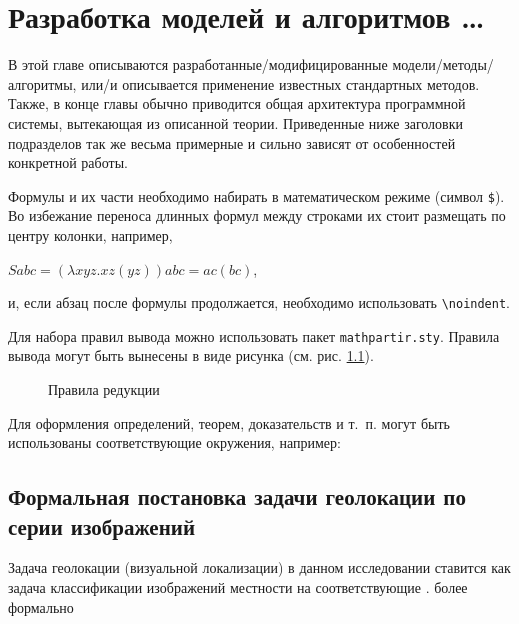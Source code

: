 \chapter{Разработка моделей и алгоритмов \dots}

В этой главе описываются разработанные/модифицированные модели/методы/
алгоритмы, или/и описывается применение известных стандартных методов. Также, 
в конце главы обычно приводится общая архитектура программной системы, 
вытекающая из описанной теории. Приведенные ниже заголовки подразделов так же 
весьма примерные и сильно зависят от особенностей конкретной работы.

Формулы и их части необходимо набирать в математическом режиме
(символ \verb|$|). Во избежание переноса длинных формул между строками их 
стоит размещать по центру колонки, например,
\begin{center}
$S a b c = (\lambda x y z. x z (y z)) a b c = a c (b c)$,
\end{center}
\noindent и, если абзац после формулы продолжается, необходимо использовать 
\verb|\noindent|.

Для набора правил вывода можно использовать пакет \texttt{mathpartir.sty}. 
Правила вывода могут быть вынесены в виде рисунка (см. рис. 
\ref{img:inferrules}).

\begin{figure}[t]
  \centering
  \caption{Правила редукции}
  \label{img:inferrules}
\end{figure}

Для оформления определений, теорем, доказательств и т.~п. могут быть 
использованы соответствующие окружения, например:



\section{Формальная постановка задачи геолокации по серии изображений}

Задача геолокации (визуальной локализации) в данном исследовании ставится как задача классификации изображений местности на соответствующие . более формально

